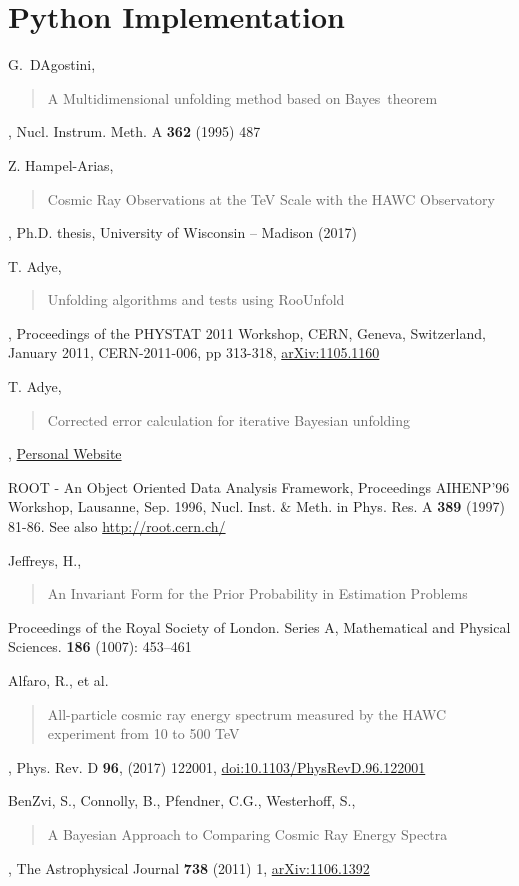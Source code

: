 \documentclass[11pt, letter]{article}
\begin{document}
\section{Python Implementation}\label{python_code_section}

\newpage

\begin{thebibliography}{99}

 G.~D\textquotesingle Agostini, \blockquote{A Multidimensional unfolding method based on Bayes\textquotesingle \ theorem}, 
Nucl. Instrum. Meth. A {\bf 362} (1995) 487

 Z. Hampel-Arias, \blockquote{Cosmic Ray Observations at the TeV Scale with the HAWC Observatory},
Ph.D. thesis, University of Wisconsin -- Madison (2017)

 T. Adye, \blockquote{Unfolding algorithms and tests using RooUnfold}, Proceedings of the PHYSTAT 2011 Workshop, CERN, Geneva, 
Switzerland, January 2011, CERN-2011-006, pp 313-318, \href{http://arxiv.org/abs/1105.1160v1}{arXiv:1105.1160}

 T. Adye, \blockquote{Corrected error calculation for iterative Bayesian unfolding}, 
\href{http://hepunx.rl.ac.uk/~adye/software/unfold/bayes_errors.pdf}{Personal Website}

 ROOT - An Object Oriented Data Analysis Framework, Proceedings AIHENP'96 Workshop, Lausanne, Sep. 1996, Nucl. 
Inst. \& Meth. in Phys. Res. A {\bf 389} (1997) 81-86. See also \href{http://root.cern.ch/}{http://root.cern.ch/}

 Jeffreys, H., \blockquote{An Invariant Form for the Prior Probability in Estimation Problems}. 
Proceedings of the Royal Society of London. Series A, Mathematical and Physical Sciences. {\bf 186} (1007): 453–461

 Alfaro, R., et al. \blockquote{All-particle cosmic ray energy spectrum measured by the HAWC experiment from 10 to 500 TeV}, 
Phys. Rev. D {\bf 96}, (2017) 122001, \href{https://journals.aps.org/prd/abstract/10.1103/PhysRevD.96.122001}{doi:10.1103/PhysRevD.96.122001}

 BenZvi, S., Connolly, B., Pfendner, C.G., Westerhoff, S., \blockquote{A Bayesian Approach to Comparing Cosmic Ray Energy Spectra}, 
The Astrophysical Journal {\bf 738} (2011) 1, \href{https://arxiv.org/abs/1106.1392}{arXiv:1106.1392}

\end{thebibliography}
\end{document}

